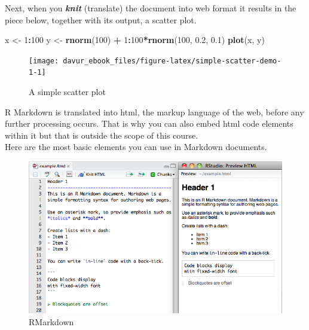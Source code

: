 \documentclass[]{book}
\newenvironment{Shaded}{\begin{snugshade}}{\end{snugshade}}
\newcommand{\DecValTok}[1]{\textcolor[rgb]{0.00,0.00,0.81}{#1}}
\newcommand{\FloatTok}[1]{\textcolor[rgb]{0.00,0.00,0.81}{#1}}
\newcommand{\KeywordTok}[1]{\textcolor[rgb]{0.13,0.29,0.53}{\textbf{#1}}}
\newcommand{\NormalTok}[1]{#1}
\newcommand{\OperatorTok}[1]{\textcolor[rgb]{0.81,0.36,0.00}{\textbf{#1}}}
\newcommand{\StringTok}[1]{\textcolor[rgb]{0.31,0.60,0.02}{#1}}
\begin{document}
Next, when you \textbf{\emph{knit}} (translate) the document into web format it results in the piece below, together with its output, a scatter plot.

\begin{Shaded}
\begin{Highlighting}[]
\NormalTok{x <-}\StringTok{ }\DecValTok{1}\OperatorTok{:}\DecValTok{100}
\NormalTok{y <-}\StringTok{ }\KeywordTok{rnorm}\NormalTok{(}\DecValTok{100}\NormalTok{) }\OperatorTok{+}\StringTok{ }\DecValTok{1}\OperatorTok{:}\DecValTok{100}\OperatorTok{*}\KeywordTok{rnorm}\NormalTok{(}\DecValTok{100}\NormalTok{, }\FloatTok{0.2}\NormalTok{, }\FloatTok{0.1}\NormalTok{)}
\KeywordTok{plot}\NormalTok{(x, y)}
\end{Highlighting}
\end{Shaded}

\begin{figure}

{\centering \texttt{[image: davur\_ebook\_files/figure-latex/simple-scatter-demo-1-1]} 

}

\caption{A simple scatter plot}\label{fig:simple-scatter-demo-1}
\end{figure}

R Markdown is translated into html, the markup language of the web, before any further processing occurs. That is why you can also embed html code elements within it but that is outside the scope of this course.\\
Here are the most basic elements you can use in Markdown documents.

\begin{figure}
\centering
\includegraphics{figures/markdownOverview.png}
\caption{RMarkdown}
\end{figure}
\end{document}

